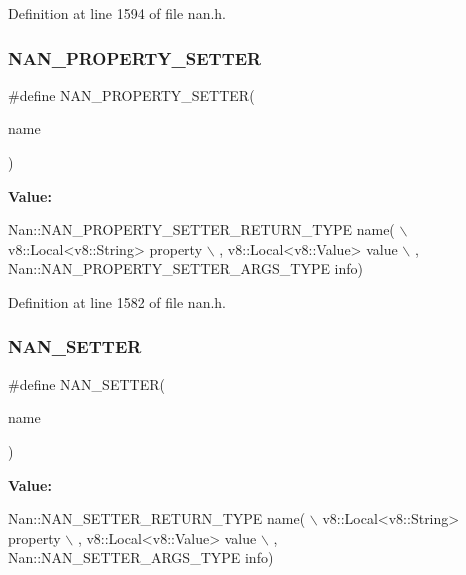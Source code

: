 Definition at line 1594 of file nan.\+h.

\mbox{\label{nan_8h_a259a50c277fc75c79342cc92a8c4c9ea}} 
\subsubsection{N\+A\+N\+\_\+\+P\+R\+O\+P\+E\+R\+T\+Y\+\_\+\+S\+E\+T\+T\+ER}
{\footnotesize\ttfamily \#define N\+A\+N\+\_\+\+P\+R\+O\+P\+E\+R\+T\+Y\+\_\+\+S\+E\+T\+T\+ER(\begin{DoxyParamCaption}\item[{}]{name }\end{DoxyParamCaption})}

{\bfseries Value\+:}
\begin{DoxyCode}
Nan::NAN_PROPERTY_SETTER_RETURN_TYPE name(                                 \(\backslash\)
        v8::Local<v8::String> property                                         \(\backslash\)
      , v8::Local<v8::Value> value                                             \(\backslash\)
      , Nan::NAN_PROPERTY_SETTER_ARGS_TYPE info)
\end{DoxyCode}


Definition at line 1582 of file nan.\+h.

\mbox{\label{nan_8h_a506eba2aa061143d7181c674b3653e0c}} 
\subsubsection{N\+A\+N\+\_\+\+S\+E\+T\+T\+ER}
{\footnotesize\ttfamily \#define N\+A\+N\+\_\+\+S\+E\+T\+T\+ER(\begin{DoxyParamCaption}\item[{}]{name }\end{DoxyParamCaption})}

{\bfseries Value\+:}
\begin{DoxyCode}
Nan::NAN_SETTER_RETURN_TYPE name(                                          \(\backslash\)
        v8::Local<v8::String> property                                         \(\backslash\)
      , v8::Local<v8::Value> value                                             \(\backslash\)
      , Nan::NAN_SETTER_ARGS_TYPE info)
\end{DoxyCode}


